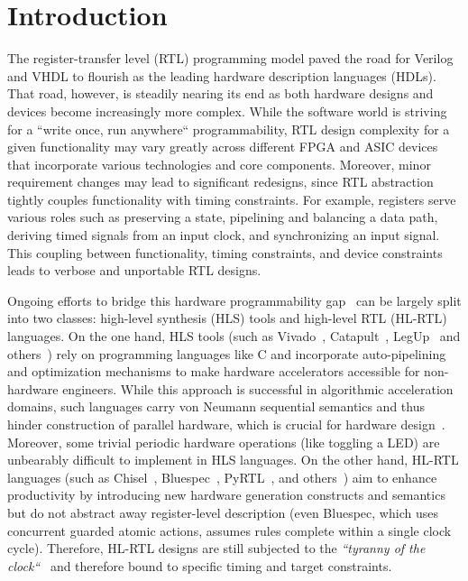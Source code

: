 \section{Introduction}
The register-transfer level (RTL) programming model paved the road for Verilog and VHDL to flourish as the leading hardware description languages (HDLs). That road, however, is steadily nearing its end as both hardware designs and devices become increasingly more complex. While the software world is striving for a ``write once, run anywhere`` programmability, RTL design complexity for a given functionality may vary greatly across different FPGA and ASIC devices that incorporate various technologies and core components. Moreover, minor requirement changes may lead to significant redesigns, since RTL abstraction tightly couples functionality with timing constraints. For example, registers serve various roles such as preserving a state, pipelining and balancing a data path, deriving timed signals from an input clock, and synchronizing an input signal. This coupling between functionality, timing constraints, and device constraints leads to verbose and unportable RTL designs. 




Ongoing efforts to bridge this hardware programmability gap~\cite{Kapre2016, Nane2016, Windh2015, Lahti2019} can be largely split into two classes: high-level synthesis (HLS) tools and high-level RTL (HL-RTL) languages.
On the one hand, HLS tools (such as Vivado~\cite{Vivado2012}, Catapult~\cite{graphics2008catapult}, LegUp~\cite{Canis2013} and others~\cite{Kavvadias2013, synphony2015, Serre, Koeplinger2018}) rely on programming languages like C and incorporate auto-pipelining and optimization mechanisms to make hardware accelerators accessible for non-hardware engineers. While this approach is successful in algorithmic acceleration domains, such languages carry von Neumann sequential semantics and thus hinder construction of parallel hardware, which is crucial for hardware design~\cite{Zhao2017}. Moreover, some trivial periodic hardware operations (like toggling a LED) are unbearably difficult to implement in HLS languages.
On the other hand, HL-RTL languages (such as Chisel~\cite{Bachrach2012}, Bluespec~\cite{nikhil2004bluespec}, PyRTL~\cite{Clow2017}, and others~\cite{Charles2016, Liu2017, jiang2018mamba, decaluwe2004myhdl, CxLang2014, Lockhart2014, Bellows}) aim to enhance productivity by introducing new hardware generation constructs and semantics but do not abstract away register-level description (even Bluespec, which uses concurrent guarded atomic actions, assumes rules complete within a single clock cycle). Therefore, HL-RTL designs are still subjected to the \emph{``tyranny of the clock``}~\cite{Sutherland2012} and therefore bound to specific timing and target constraints.

